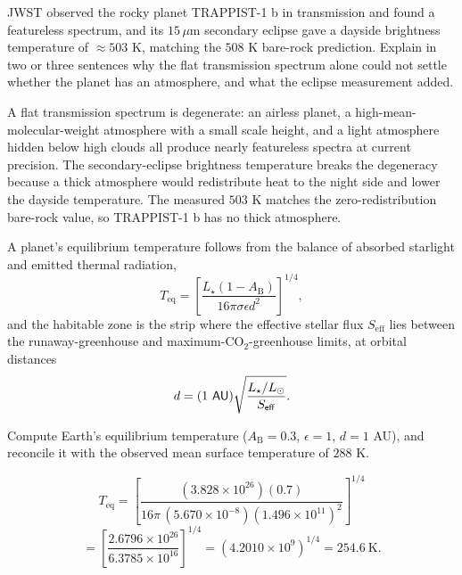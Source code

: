 \parti JWST observed the rocky planet TRAPPIST-1 b in transmission and found a featureless spectrum, and its $15\,\mu$m secondary eclipse gave a dayside brightness temperature of $\approx 503$ K, matching the $508$ K bare-rock prediction. Explain in two or three sentences why the flat transmission spectrum alone could not settle whether the planet has an atmosphere, and what the eclipse measurement added.

\begin{solution}
A flat transmission spectrum is degenerate: an airless planet, a high-mean-molecular-weight atmosphere with a small scale height, and a light atmosphere hidden below high clouds all produce nearly featureless spectra at current precision.
The secondary-eclipse brightness temperature breaks the degeneracy because a thick atmosphere would redistribute heat to the night side and lower the dayside temperature.
The measured $503$ K matches the zero-redistribution bare-rock value, so TRAPPIST-1 b has no thick atmosphere.
\end{solution}



A planet's equilibrium temperature follows from the balance of absorbed starlight and emitted thermal radiation,
\[
T_\mathrm{eq} = \left[\frac{L_\star (1 - A_\mathrm{B})}{16\pi\sigma\epsilon d^2}\right]^{1/4},
\]
and the habitable zone is the strip where the effective stellar flux $S_\mathrm{eff}$ lies between the runaway-greenhouse and maximum-$\mathrm{CO_2}$-greenhouse limits, at orbital distances
\[
d = (1\ \mathrm{AU})\sqrt{\frac{L_\star/\Lsun}{S_\mathrm{eff}}}.
\]

\parti Compute Earth's equilibrium temperature ($A_\mathrm{B} = 0.3$, $\epsilon = 1$, $d = 1$ AU), and reconcile it with the observed mean surface temperature of $288$ K.

\begin{solution}
\[
T_\mathrm{eq} = \left[\frac{(3.828\times10^{26})(0.7)}{16\pi\,(5.670\times10^{-8})(1.496\times10^{11})^2}\right]^{1/4}
\]
\[
= \left[\frac{2.6796\times10^{26}}{6.3785\times10^{16}}\right]^{1/4}
= (4.2010\times10^{9})^{1/4} = 254.6\ \mathrm{K}.
\]
\end{solution}

